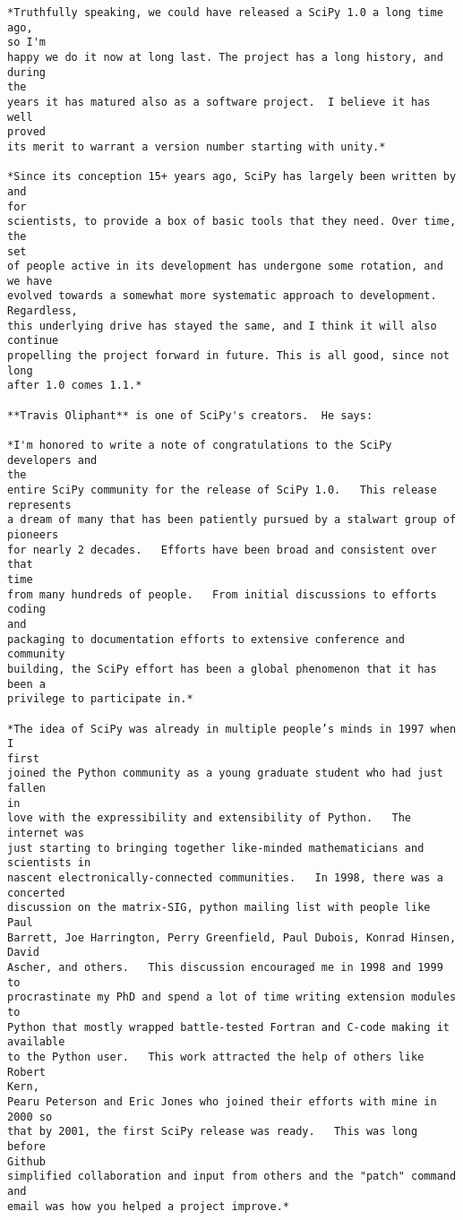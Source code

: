 \begin{verbatim}
*Truthfully speaking, we could have released a SciPy 1.0 a long time ago,
so I'm
happy we do it now at long last. The project has a long history, and during
the
years it has matured also as a software project.  I believe it has well
proved
its merit to warrant a version number starting with unity.*

*Since its conception 15+ years ago, SciPy has largely been written by and
for
scientists, to provide a box of basic tools that they need. Over time, the
set
of people active in its development has undergone some rotation, and we have
evolved towards a somewhat more systematic approach to development.
Regardless,
this underlying drive has stayed the same, and I think it will also continue
propelling the project forward in future. This is all good, since not long
after 1.0 comes 1.1.*

**Travis Oliphant** is one of SciPy's creators.  He says:

*I'm honored to write a note of congratulations to the SciPy developers and
the
entire SciPy community for the release of SciPy 1.0.   This release
represents
a dream of many that has been patiently pursued by a stalwart group of
pioneers
for nearly 2 decades.   Efforts have been broad and consistent over that
time
from many hundreds of people.   From initial discussions to efforts coding
and
packaging to documentation efforts to extensive conference and community
building, the SciPy effort has been a global phenomenon that it has been a
privilege to participate in.*

*The idea of SciPy was already in multiple people’s minds in 1997 when I
first
joined the Python community as a young graduate student who had just fallen
in
love with the expressibility and extensibility of Python.   The internet was
just starting to bringing together like-minded mathematicians and
scientists in
nascent electronically-connected communities.   In 1998, there was a
concerted
discussion on the matrix-SIG, python mailing list with people like Paul
Barrett, Joe Harrington, Perry Greenfield, Paul Dubois, Konrad Hinsen, David
Ascher, and others.   This discussion encouraged me in 1998 and 1999 to
procrastinate my PhD and spend a lot of time writing extension modules to
Python that mostly wrapped battle-tested Fortran and C-code making it
available
to the Python user.   This work attracted the help of others like Robert
Kern,
Pearu Peterson and Eric Jones who joined their efforts with mine in 2000 so
that by 2001, the first SciPy release was ready.   This was long before
Github
simplified collaboration and input from others and the "patch" command and
email was how you helped a project improve.*


\end{verbatim}
